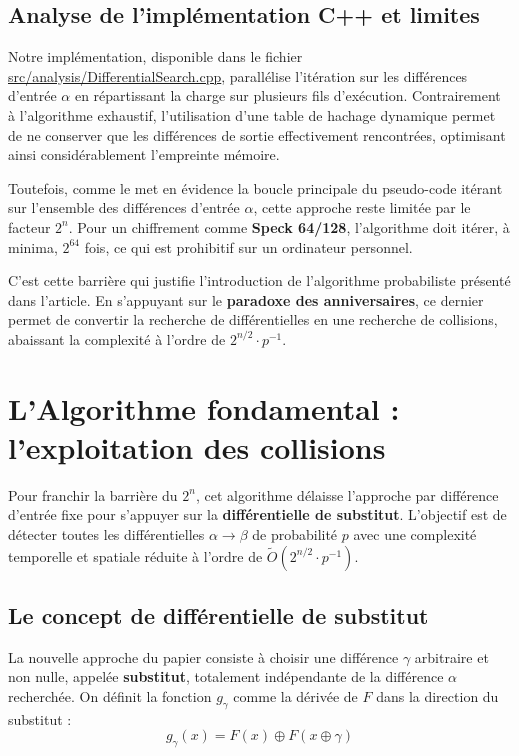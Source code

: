 \documentclass[a4paper,11pt]{article}
\begin{document}
\subsection{Analyse de l'implémentation C++ et limites}

Notre implémentation, disponible dans le fichier \url{src/analysis/DifferentialSearch.cpp}, parallélise l'itération sur les différences d'entrée $\alpha$ en répartissant la charge sur plusieurs fils d'exécution. Contrairement à l'algorithme exhaustif, l'utilisation d'une table de hachage dynamique permet de ne conserver que les différences de sortie effectivement rencontrées, optimisant ainsi considérablement l'empreinte mémoire.

Toutefois, comme le met en évidence la boucle principale du pseudo-code itérant sur l'ensemble des différences d'entrée $\alpha$, cette approche reste limitée par le facteur $2^n$. Pour un chiffrement comme \textbf{Speck 64/128}, l'algorithme doit itérer, à minima, $2^{64}$ fois, ce qui est prohibitif sur un ordinateur personnel.

C'est cette barrière qui justifie l'introduction de l'algorithme probabiliste présenté dans l'article. En s'appuyant sur le \textbf{paradoxe des anniversaires}, ce dernier permet de convertir la recherche de différentielles en une recherche de collisions, abaissant la complexité à l'ordre de $2^{n/2} \cdot p^{-1}$.

\section{L'Algorithme fondamental : l'exploitation des collisions}

Pour franchir la barrière du $2^n$, cet algorithme délaisse l'approche par différence d'entrée fixe pour s'appuyer sur la \textbf{différentielle de substitut}. L'objectif est de détecter toutes les différentielles $\alpha \rightarrow \beta$ de probabilité $p$ avec une complexité temporelle et spatiale réduite à l'ordre de $\tilde{O}(2^{n/2} \cdot p^{-1})$.

\subsection{Le concept de différentielle de substitut}

La nouvelle approche du papier consiste à choisir une différence $\gamma$ arbitraire et non nulle, appelée \textbf{substitut}, totalement indépendante de la différence $\alpha$ recherchée. On définit la fonction $g_{\gamma}$ comme la dérivée de $F$ dans la direction du substitut :
\begin{equation*}
    g_{\gamma}(x) = F(x) \oplus F(x \oplus \gamma)
\end{equation*}
\end{document}
